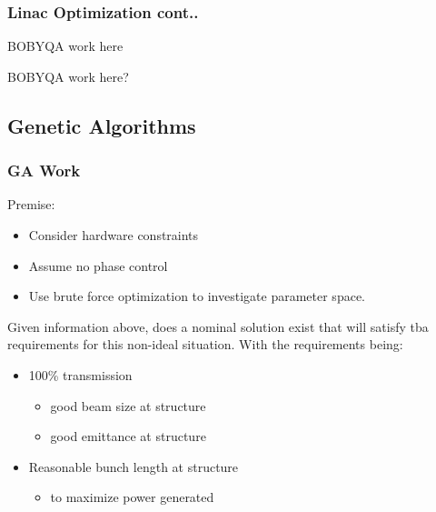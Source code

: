 \documentclass[professionalfonts,t]{beamer}
\begin{document}
\begin{frame}
	\frametitle{Linac Optimization cont..}
	BOBYQA work here
\end{frame}

\begin{frame}
	BOBYQA work here?
\end{frame}

\subsection{Genetic Algorithms}
\begin{frame}
\frametitle{GA Work}
Premise: 
\begin{itemize}
	\item Consider hardware constraints
	\item Assume no phase control
	\item Use brute force optimization to investigate parameter space.
\end{itemize}

\vspace{0.5em}
Given information above, does a nominal solution exist that will satisfy tba requirements for this non-ideal situation. With the requirements being:
\begin{itemize}
	\item 100\% transmission 
	\begin{itemize}
		\item good beam size at structure
		\item good emittance at structure
	\end{itemize}
	\item Reasonable bunch length at structure
	\begin{itemize}
		\item to maximize power generated
	\end{itemize}
\end{itemize}
	 
\end{frame}
\end{document}

